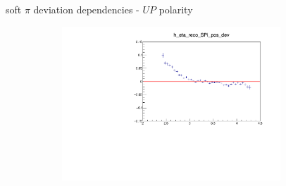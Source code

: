 \documentclass[11pt]{beamer}
\begin{document}
\begin{frame}{soft $\pi$ deviation dependencies - $UP$ polarity}
\begin{figure}
\begin{subfigure}{0.45\textwidth}
\end{subfigure}
\begin{subfigure}{0.45\textwidth}
\includegraphics[width=0.9\textwidth]{first/up_pdf/deviation/h_eta_reco_SPi_pos_dev.pdf}
\end{subfigure}
\end{figure}
\end{frame}
\end{document}
